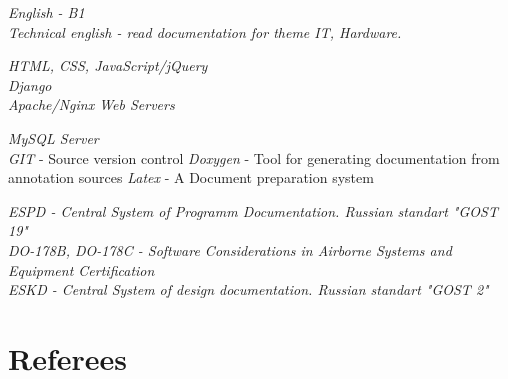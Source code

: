 {
\textit{English - B1}\\
\textit{Technical english - read documentation for theme IT, Hardware.}
}


{
\textit{HTML, CSS, JavaScript/jQuery}\\
\textit{Django}\\
\textit{Apache/Nginx Web Servers}
}


{
\textit{MySQL Server}\\
\textit{GIT} - Source version control
\textit{Doxygen} - Tool for generating documentation from annotation sources
\textit{Latex} - A Document preparation system

}



{
\textit{ESPD - Central System of Programm Documentation. Russian standart "GOST 19"}\\
\textit{DO-178B, DO-178C - Software Considerations in Airborne Systems and Equipment Certification}\\
\textit{ESKD - Central System of design documentation. Russian standart "GOST 2"}
}




\section{Referees}

